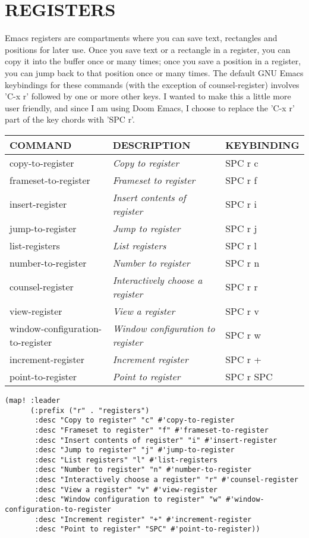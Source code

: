 \documentclass[11pt]{article}
\begin{document}
\section{REGISTERS}
\label{sec:org414ced5}
Emacs registers are compartments where you can save text, rectangles and positions for later use. Once you save text or a rectangle in a register, you can copy it into the buffer once or many times; once you save a position in a register, you can jump back to that position once or many times.  The default GNU Emacs keybindings for these commands (with the exception of counsel-register) involves 'C-x r' followed by one or more other keys.  I wanted to make this a little more user friendly, and since I am using Doom Emacs, I choose to replace the 'C-x r' part of the key chords with 'SPC r'.

\begin{center}
\begin{tabular}{lll}
COMMAND & DESCRIPTION & KEYBINDING\\[0pt]
\hline
copy-to-register & \emph{Copy to register} & SPC r c\\[0pt]
frameset-to-register & \emph{Frameset to register} & SPC r f\\[0pt]
insert-register & \emph{Insert contents of register} & SPC r i\\[0pt]
jump-to-register & \emph{Jump to register} & SPC r j\\[0pt]
list-registers & \emph{List registers} & SPC r l\\[0pt]
number-to-register & \emph{Number to register} & SPC r n\\[0pt]
counsel-register & \emph{Interactively choose a register} & SPC r r\\[0pt]
view-register & \emph{View a register} & SPC r v\\[0pt]
window-configuration-to-register & \emph{Window configuration to register} & SPC r w\\[0pt]
increment-register & \emph{Increment register} & SPC r +\\[0pt]
point-to-register & \emph{Point to register} & SPC r SPC\\[0pt]
\end{tabular}
\end{center}

\begin{verbatim}
(map! :leader
      (:prefix ("r" . "registers")
       :desc "Copy to register" "c" #'copy-to-register
       :desc "Frameset to register" "f" #'frameset-to-register
       :desc "Insert contents of register" "i" #'insert-register
       :desc "Jump to register" "j" #'jump-to-register
       :desc "List registers" "l" #'list-registers
       :desc "Number to register" "n" #'number-to-register
       :desc "Interactively choose a register" "r" #'counsel-register
       :desc "View a register" "v" #'view-register
       :desc "Window configuration to register" "w" #'window-configuration-to-register
       :desc "Increment register" "+" #'increment-register
       :desc "Point to register" "SPC" #'point-to-register))
\end{verbatim}
\end{document}
